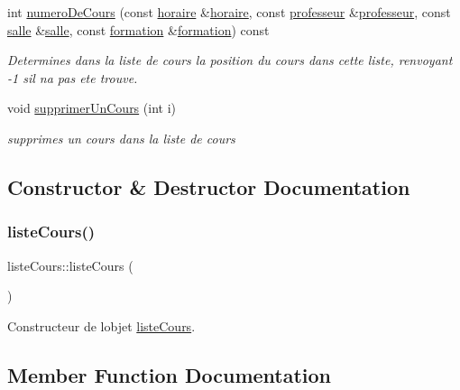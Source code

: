 \begin{DoxyCompactItemize}
int \hyperlink{classliste_cours_a71e0b3dd96c917afdb8206a43b0f83bd}{numero\+De\+Cours} (const \hyperlink{classhoraire}{horaire} \&\hyperlink{classhoraire}{horaire}, const \hyperlink{classprofesseur}{professeur} \&\hyperlink{classprofesseur}{professeur}, const \hyperlink{classsalle}{salle} \&\hyperlink{classsalle}{salle}, const \hyperlink{classformation}{formation} \&\hyperlink{classformation}{formation}) const
\begin{DoxyCompactList}\small\item\em Determines dans la liste de cours la position du cours dans cette liste, renvoyant -\/1 s\textquotesingle{}il n\textquotesingle{}a pas ete trouve. \end{DoxyCompactList}\item 
void \hyperlink{classliste_cours_a772f9af062114a9b5f2420e3bbe3e675}{supprimer\+Un\+Cours} (int i)
\begin{DoxyCompactList}\small\item\em supprimes un cours dans la liste de cours \end{DoxyCompactList}\end{DoxyCompactItemize}


\subsection{Constructor \& Destructor Documentation}
\hypertarget{classliste_cours_af5a10a6e898373e43355b8a29dc20b83}{}\label{classliste_cours_af5a10a6e898373e43355b8a29dc20b83} 
\subsubsection{\texorpdfstring{liste\+Cours()}{listeCours()}}
{\footnotesize\ttfamily liste\+Cours\+::liste\+Cours (\begin{DoxyParamCaption}{ }\end{DoxyParamCaption})}



Constructeur de l\textquotesingle{}objet \hyperlink{classliste_cours}{liste\+Cours}. 



\subsection{Member Function Documentation}
\hypertarget{classliste_cours_aacc38305cfea76d8cc77d710d144ce8b}{}\label{classliste_cours_aacc38305cfea76d8cc77d710d144ce8b} 
